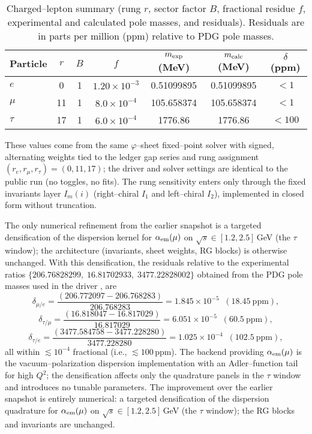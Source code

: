 \documentclass[%
  amsmath,amssymb,
  aps,
 prb,
 floatfix, showkeys
 ]{revtex4-2}
\begin{document}
 \begin{table}[H]
 \caption{Charged--lepton summary (rung $r$, sector factor $B$, fractional residue $f$, experimental and calculated pole masses, and residuals). Residuals are in parts per million (ppm) relative to PDG pole masses.}
 \label{tab:leptons}
 \begin{tabular}{l c c c c c c}
 \hline
 Particle & $r$ & $B$ & $f$ & $m_{\rm exp}$ (MeV) & $m_{\rm calc}$ (MeV) & $\delta$ (ppm) \\
 \hline
 $e$   & 0  & 1 & $1.20\times10^{-3}$ & 0.51099895 & 0.51099895 & $<\!1$ \\
 $\mu$ & 11 & 1 & $8.0\times10^{-4}$ & 105.658374 & 105.658374 & $<\!1$ \\
 $\tau$& 17 & 1 & $6.0\times10^{-4}$ & 1776.86 & 1776.86 & $<\!100$ \\
 \hline
 \end{tabular}
 \end{table}
 
 These values come from the same $\varphi$--sheet fixed--point solver with signed,
 alternating weights tied to the ledger gap series and rung assignment
 $(r_e,r_\mu,r_\tau)=(0,11,17)$; the driver and solver settings are identical to
 the public run (no toggles, no fits). The rung sensitivity enters only through the fixed invariants layer
 $I_m(i)$ (right--chiral $I_1$  and left--chiral $I_2$), implemented in closed form without truncation.
 
 The only numerical refinement from the earlier snapshot is a targeted densification of the dispersion kernel for $\alpha_{\rm em}(\mu)$ on $\sqrt{s}\!\in[1.2,2.5]$\,GeV (the $\tau$ window); the architecture (invariants, sheet weights, RG blocks) is otherwise unchanged. With this densification, the residuals relative to the experimental ratios  $\{206.76828299,\; 16.81702933,\; 3477.22828002\}$ obtained from the PDG pole masses used in the driver \cite{PDG2024},  are
 \[
 \delta_{\mu/e}=\frac{(206.772097-206.768283)}{206.768283}=1.845\times 10^{-5}\;\;(18.45~\mathrm{ppm}),
 \]
 \[
 \delta_{\tau/\mu}=\frac{(16.818047-16.817029)}{16.817029}=6.051\times 10^{-5}\;\;(60.5~\mathrm{ppm}),
 \]
 \[
 \delta_{\tau/e}=\frac{(3477.584758-3477.228280)}{3477.228280}=1.025\times 10^{-4}\;\;(102.5~\mathrm{ppm}),
 \]
  all within $\lesssim 10^{-4}$ fractional (i.e., $\lesssim 100$\,ppm). The backend providing $\alpha_{\rm em}(\mu)$ is the vacuum–polarization dispersion implementation with an Adler–function tail for high $Q^2$; the densification affects only the quadrature panels in the $\tau$ window and introduces no tunable parameters.
  The improvement over the earlier snapshot is entirely numerical: a targeted densification of the dispersion quadrature for $\alpha_{\rm em}(\mu)$ on $\sqrt{s}\!\in[1.2,2.5]$\,GeV (the $\tau$ window); the RG blocks and invariants are unchanged.
 
\end{document}
